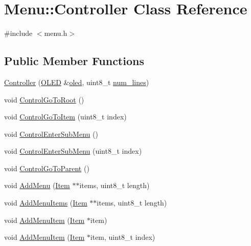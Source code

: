 \hypertarget{class_menu_1_1_controller}{}\section{Menu\+:\+:Controller Class Reference}
\label{class_menu_1_1_controller}


{\ttfamily \#include $<$menu.\+h$>$}

\subsection*{Public Member Functions}
\begin{DoxyCompactItemize}
\item 
\hyperlink{class_menu_1_1_controller_afcbda47e43a9753875631f0d4106f604}{Controller} (\hyperlink{class_o_l_e_d}{O\+L\+ED} \&\hyperlink{class_menu_1_1_controller_aaa0388123d9e3bb0d4f546336e2b502d}{oled}, uint8\+\_\+t \hyperlink{class_menu_1_1_controller_a80d614a66d1ffa2612688776842f1f31}{num\+\_\+lines})
\item 
void \hyperlink{class_menu_1_1_controller_a4d270009fff9dfc6baa4433f219626c4}{Control\+Go\+To\+Root} ()
\item 
void \hyperlink{class_menu_1_1_controller_a0dae623388e9bb9e651385d0ef9a2394}{Control\+Go\+To\+Item} (uint8\+\_\+t index)
\item 
void \hyperlink{class_menu_1_1_controller_a9a4c0ccd822f485834ec9abb4133a059}{Control\+Enter\+Sub\+Menu} ()
\item 
void \hyperlink{class_menu_1_1_controller_a8bc1d62574e86a08d5a60652370dd21a}{Control\+Enter\+Sub\+Menu} (uint8\+\_\+t index)
\item 
void \hyperlink{class_menu_1_1_controller_ad4bcb0925c933dce2cceacdbd1b26294}{Control\+Go\+To\+Parent} ()
\item 
void \hyperlink{class_menu_1_1_controller_ab530ec11f04b96254b93961d26152d3c}{Add\+Menu} (\hyperlink{struct_menu_1_1_item}{Item} $\ast$$\ast$items, uint8\+\_\+t length)
\item 
void \hyperlink{class_menu_1_1_controller_ad28e732923bf111fd26a7ea031885f70}{Add\+Menu\+Items} (\hyperlink{struct_menu_1_1_item}{Item} $\ast$$\ast$items, uint8\+\_\+t length)
\item 
void \hyperlink{class_menu_1_1_controller_a777d65ba4f168aed6c1c44022ca4c658}{Add\+Menu\+Item} (\hyperlink{struct_menu_1_1_item}{Item} $\ast$item)
\item 
void \hyperlink{class_menu_1_1_controller_a9e5366f182975680e88749f03d249a0a}{Add\+Menu\+Item} (\hyperlink{struct_menu_1_1_item}{Item} $\ast$item, uint8\+\_\+t index)

\end{DoxyCompactItemize}
